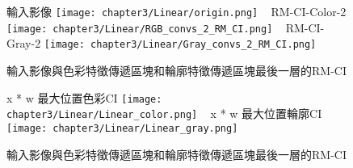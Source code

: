 \documentclass[class=NCU_thesis, crop=false]{standalone}
\begin{document}
\begin{figure}[H]
    \centering
    \subcaptionbox
        {輸入影像
        \label{fig:linear-RM-Input}}
        {\texttt{[image: chapter3/Linear/origin.png]}}
    ~
    \subcaptionbox
        {RM-CI-Color-2
        \label{fig:linear-RM-CI-color-2}}
        {\texttt{[image: chapter3/Linear/RGB\_convs\_2\_RM\_CI.png]}}
    ~
    \subcaptionbox
        {RM-CI-Gray-2
        \label{fig:linear-RM-CI-gray-2}}
        {\texttt{[image: chapter3/Linear/Gray\_convs\_2\_RM\_CI.png]}}
    \caption{輸入影像與色彩特徵傳遞區塊和輪廓特徵傳遞區塊最後一層的RM-CI\cite{YangCNNInterpretable}}
    \label{fig:RM-CI}
\end{figure}

\begin{figure}[H]
    \centering
    \subcaptionbox
        {x * w 最大位置色彩CI
        \label{fig:linear-rgb}}
        {\texttt{[image: chapter3/Linear/Linear\_color.png]}}
    ~
    \subcaptionbox
        {x * w 最大位置輪廓CI
        \label{fig:linear-gray}}
        {\texttt{[image: chapter3/Linear/Linear\_gray.png]}}
    \caption{輸入影像與色彩特徵傳遞區塊和輪廓特徵傳遞區塊最後一層的RM-CI\cite{YangCNNInterpretable}}
    \label{fig:Linear-w-x}
\end{figure}
\end{document}
